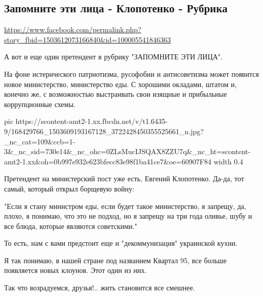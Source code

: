  
 
 
 
 

\subsection{Запомните эти лица - Клопотенко - Рубрика}
\label{sec:05_04_2021.fb.ivanova_zoja.1.lico}
\url{https://www.facebook.com/permalink.php?story_fbid=1503612073166840&id=100005541846363}

А вот и еще один претендент  в рубрику "ЗАПОМНИТЕ ЭТИ ЛИЦА".

На фоне истерического патриотизма, русофобии и антисоветизма может появится
новое министерство, министерство еды. С хорошими окладами, штатом и, конечно
же, с возможностью выстраивать свои изящные и прибыльные коррупционные схемы.

\ifcmt
  pic https://scontent-amt2-1.xx.fbcdn.net/v/t1.6435-9/168429766_1503609193167128_3722428450355525661_n.jpg?_nc_cat=109&ccb=1-3&_nc_sid=730e14&_nc_ohc=0ZLsMucIJSQAX8ZZU7q&_nc_ht=scontent-amt2-1.xx&oh=0b997e932e623bfecc83e98f1ba41ce7&oe=60907F84
  width 0.4
\fi

Претендент на министерский пост уже есть, Евгений Клопотенко. Да-да, тот самый, который открыл борщевую войну: 

"Если я стану министром еды, если будет такое министерство, я запрещу, да,
плохо, я понимаю, что это не подход, но я запрещу на три года оливье, шубу и
все блюда, которые являются советскими."

То есть, нам с вами предстоит еще и "декоммунизация" украинской кухни.

Я так понимаю, в нашей стране под названием Квартал 95, все больше появляется
новых клоунов.  Этот один из них.

Так что возрадуемся, друзья!.. жить становится все смешнее.




